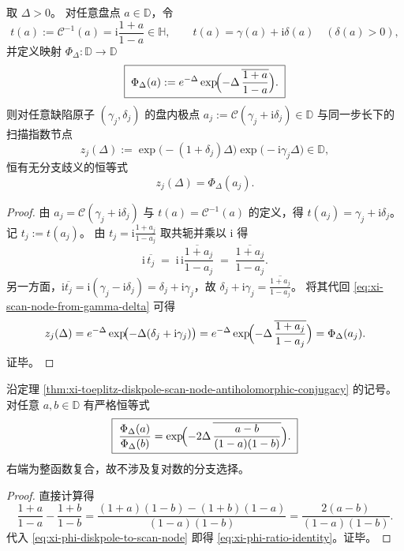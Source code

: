 \begin{theorem}\label{thm:xi-toeplitz-diskpole-scan-node-antiholomorphic-conjugacy}
取 \(\Delta>0\)。
对任意盘点 \(a\in\mathbb{D}\)，令
\[
t(a):=\mathcal{C}^{-1}(a)=\mathrm{i}\frac{1+a}{1-a}\in\mathbb{H},
\qquad
t(a)=\gamma(a)+\mathrm{i}\delta(a)\quad(\delta(a)>0),
\]
并定义映射 \(\Phi_{\Delta}:\mathbb{D}\to\mathbb{D}\)
\begin{equation}\label{eq:xi-phi-diskpole-to-scan-node}
\boxed{\;
\Phi_{\Delta}(a)
:=e^{-\Delta}\exp\!\Bigl(-\Delta\,\overline{\frac{1+a}{1-a}}\Bigr).\;}
\end{equation}
则对任意缺陷原子 \((\gamma_j,\delta_j)\) 的盘内极点
\(
a_j:=\mathcal{C}(\gamma_j+\mathrm{i}\delta_j)\in\mathbb{D}
\)
与同一步长下的扫描指数节点
\begin{equation}\label{eq:xi-scan-node-from-gamma-delta}
z_j(\Delta):=\exp\!\bigl(-(1+\delta_j)\Delta\bigr)\exp\!\bigl(-\mathrm{i}\gamma_j\Delta\bigr)\in\mathbb{D},
\end{equation}
恒有无分支歧义的恒等式
\[
\boxed{\;z_j(\Delta)=\Phi_{\Delta}(a_j).\;}
\]
\end{theorem}
\begin{proof}
由 \(a_j=\mathcal{C}(\gamma_j+\mathrm{i}\delta_j)\) 与 \(t(a)=\mathcal{C}^{-1}(a)\) 的定义，得
\(
t(a_j)=\gamma_j+\mathrm{i}\delta_j
\)。
记 \(t_j:=t(a_j)\)。
由
\(
t_j=\mathrm{i}\frac{1+a_j}{1-a_j}
\)
取共轭并乘以 \(\mathrm{i}\) 得
\[
\mathrm{i}\,\overline{t_j}
\;=\;
\mathrm{i}\,\overline{\mathrm{i}\frac{1+a_j}{1-a_j}}
\;=\;
\overline{\frac{1+a_j}{1-a_j}}.
\]
另一方面，\(\mathrm{i}\overline{t_j}=\mathrm{i}(\gamma_j-\mathrm{i}\delta_j)=\delta_j+\mathrm{i}\gamma_j\)，故
\(
\delta_j+\mathrm{i}\gamma_j=\overline{\frac{1+a_j}{1-a_j}}
\)。
将其代回 \eqref{eq:xi-scan-node-from-gamma-delta} 可得
\[
z_j(\Delta)
=e^{-\Delta}\exp\!\bigl(-\Delta(\delta_j+\mathrm{i}\gamma_j)\bigr)
=e^{-\Delta}\exp\!\Bigl(-\Delta\,\overline{\frac{1+a_j}{1-a_j}}\Bigr)
=\Phi_\Delta(a_j).
\]
证毕。
\end{proof}

\begin{proposition}\label{prop:xi-phi-diskpole-ratio-identity}
沿定理 \ref{thm:xi-toeplitz-diskpole-scan-node-antiholomorphic-conjugacy} 的记号。
对任意 \(a,b\in\mathbb{D}\) 有严格恒等式
\begin{equation}\label{eq:xi-phi-ratio-identity}
\boxed{\;
\frac{\Phi_{\Delta}(a)}{\Phi_{\Delta}(b)}
=\exp\!\Bigl(-2\Delta\,\overline{\frac{a-b}{(1-a)(1-b)}}\Bigr).\;}
\end{equation}
右端为整函数复合，故不涉及复对数的分支选择。
\end{proposition}
\begin{proof}
直接计算得
\[
\frac{1+a}{1-a}-\frac{1+b}{1-b}
=\frac{(1+a)(1-b)-(1+b)(1-a)}{(1-a)(1-b)}
=\frac{2(a-b)}{(1-a)(1-b)}.
\]
代入 \eqref{eq:xi-phi-diskpole-to-scan-node} 即得 \eqref{eq:xi-phi-ratio-identity}。证毕。
\end{proof}


